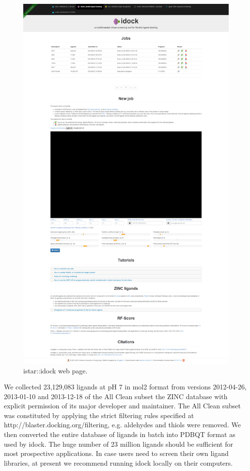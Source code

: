 \begin{figure}
\centering
\includegraphics[width=\linewidth]{../istar/idock.png}
\caption{istar::idock web page.}
\label{istar:idock}
\end{figure}

We collected 23,129,083 ligands at pH 7 in mol2 format from versions 2012-04-26, 2013-01-10 and 2013-12-18 of the All Clean subset the ZINC database \citep{532,1178} with explicit permission of its major developer and maintainer. The All Clean subset was constituted by applying the strict filtering rules specified at http://blaster.docking.org/filtering, e.g. aldehydes and thiols were removed. We then converted the entire database of ligands in batch into PDBQT format as used by idock. The huge number of 23 million ligands should be sufficient for most prospective applications. In case users need to screen their own ligand libraries, at present we recommend running idock locally on their computers.


